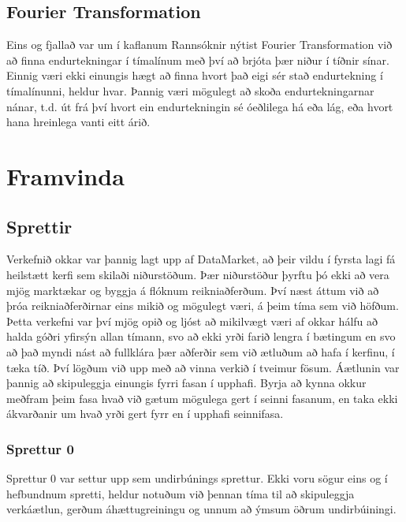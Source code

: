 \documentclass{article}
\begin{document}
\subsection{Fourier Transformation}
Eins og fjallað var um í kaflanum Rannsóknir nýtist Fourier
Transformation við að finna endurtekningar í tímalínum með því að brjóta þær
niður í tíðnir sínar.  
Einnig væri ekki einungis hægt að finna hvort það eigi sér stað endurtekning í
tímalínunni, heldur hvar. Þannig væri mögulegt að skoða endurtekningarnar nánar,
t.d. út frá því hvort ein endurtekningin sé óeðlilega há eða lág, eða hvort hana
hreinlega vanti eitt árið.




\section{Framvinda}
\subsection{Sprettir}
Verkefnið okkar var þannig lagt upp af DataMarket, að þeir vildu í fyrsta lagi
fá heilstætt kerfi sem skilaði niðurstöðum. 
Þær niðurstöður þyrftu þó ekki að vera mjög marktækar og byggja á flóknum
reikniaðferðum. Því næst áttum við að þróa reikniaðferðirnar eins 
mikið og mögulegt væri, á þeim tíma sem við höfðum. Þetta verkefni var því mjög
opið og ljóst að mikilvægt væri 
af okkar hálfu að halda góðri yfirsýn allan tímann, svo að ekki yrði farið
lengra í bætingum en svo að það myndi nást að fullklára þær 
aðferðir sem við ætluðum að hafa í kerfinu, í tæka tíð. Því lögðum við upp með
að vinna verkið í tveimur fösum. Áætlunin var þannig að skipuleggja
einungis fyrri fasan í upphafi. Byrja að kynna okkur meðfram þeim fasa hvað við
gætum mögulega gert í seinni fasanum, en taka ekki ákvarðanir 
um hvað yrði gert fyrr en í upphafi seinnifasa.

\subsubsection{Sprettur 0}
Sprettur 0 var settur upp sem undirbúnings sprettur. Ekki voru sögur eins og í
hefbundnum spretti, heldur notuðum við þennan tíma til að 
skipuleggja verkáætlun, gerðum áhættugreiningu og unnum að ýmsum öðrum
undirbúiningi.
\end{document}
